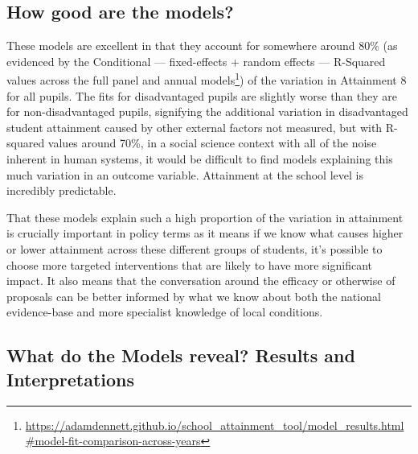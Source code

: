 \documentclass[
  11pt,
]{article}
\begin{document}
\subsection{How good are the models?}\label{how-good-are-the-models}

These models are excellent in that they account for somewhere around
80\% (as evidenced by the Conditional --- fixed-effects + random effects
--- R-Squared values across the full panel and annual models\footnote{\url{https://adamdennett.github.io/school_attainment_tool/model_results.html\#model-fit-comparison-across-years}})
of the variation in Attainment 8 for all pupils. The fits for
disadvantaged pupils are slightly worse than they are for
non-disadvantaged pupils, signifying the additional variation in
disadvantaged student attainment caused by other external factors not
measured, but with R-squared values around 70\%, in a social science
context with all of the noise inherent in human systems, it would be
difficult to find models explaining this much variation in an outcome
variable. Attainment at the school level is incredibly predictable.

That these models explain such a high proportion of the variation in
attainment is crucially important in policy terms as it means if we know
what causes higher or lower attainment across these different groups of
students, it's possible to choose more targeted interventions that are
likely to have more significant impact. It also means that the
conversation around the efficacy or otherwise of proposals can be better
informed by what we know about both the national evidence-base and more
specialist knowledge of local conditions.

\subsection{What do the Models reveal? Results and
Interpretations}\label{what-do-the-models-reveal-results-and-interpretations}
\end{document}
